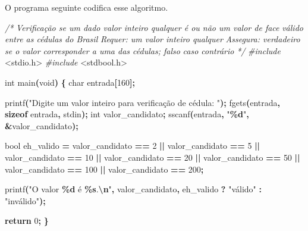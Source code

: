 \documentclass[
  11pt,
  a4paper,
]{scrbook}
\newenvironment{Shaded}{\begin{snugshade}}{\end{snugshade}}
\newcommand{\CommentTok}[1]{\textcolor[rgb]{0.56,0.35,0.01}{\textit{#1}}}
\newcommand{\ControlFlowTok}[1]{\textcolor[rgb]{0.13,0.29,0.53}{\textbf{#1}}}
\newcommand{\DataTypeTok}[1]{\textcolor[rgb]{0.13,0.29,0.53}{#1}}
\newcommand{\DecValTok}[1]{\textcolor[rgb]{0.00,0.00,0.81}{#1}}
\newcommand{\ImportTok}[1]{#1}
\newcommand{\KeywordTok}[1]{\textcolor[rgb]{0.13,0.29,0.53}{\textbf{#1}}}
\newcommand{\NormalTok}[1]{#1}
\newcommand{\OperatorTok}[1]{\textcolor[rgb]{0.81,0.36,0.00}{\textbf{#1}}}
\newcommand{\PreprocessorTok}[1]{\textcolor[rgb]{0.56,0.35,0.01}{\textit{#1}}}
\newcommand{\SpecialCharTok}[1]{\textcolor[rgb]{0.81,0.36,0.00}{\textbf{#1}}}
\newcommand{\StringTok}[1]{\textcolor[rgb]{0.31,0.60,0.02}{#1}}
\begin{document}
O programa seguinte codifica esse algoritmo.

\begin{Shaded}
\begin{Highlighting}[]
\CommentTok{/*}
\CommentTok{Verificação se um dado valor inteiro qualquer é ou não um valor de face}
\CommentTok{    válido entre as cédulas do Brasil}
\CommentTok{Requer: um valor inteiro qualquer}
\CommentTok{Assegura: verdadeiro se o valor corresponder a uma das cédulas; falso}
\CommentTok{    caso contrário}
\CommentTok{*/}
\PreprocessorTok{\#include }\ImportTok{\textless{}stdio.h\textgreater{}}
\PreprocessorTok{\#include }\ImportTok{\textless{}stdbool.h\textgreater{}}

\DataTypeTok{int}\NormalTok{ main}\OperatorTok{(}\DataTypeTok{void}\OperatorTok{)} \OperatorTok{\{}
    \DataTypeTok{char}\NormalTok{ entrada}\OperatorTok{[}\DecValTok{160}\OperatorTok{];}

\NormalTok{    printf}\OperatorTok{(}\StringTok{"Digite um valor inteiro para verificação de cédula: "}\OperatorTok{);}
\NormalTok{    fgets}\OperatorTok{(}\NormalTok{entrada}\OperatorTok{,} \KeywordTok{sizeof}\NormalTok{ entrada}\OperatorTok{,}\NormalTok{ stdin}\OperatorTok{);}
    \DataTypeTok{int}\NormalTok{ valor\_candidato}\OperatorTok{;}
\NormalTok{    sscanf}\OperatorTok{(}\NormalTok{entrada}\OperatorTok{,} \StringTok{"}\SpecialCharTok{\%d}\StringTok{"}\OperatorTok{,} \OperatorTok{\&}\NormalTok{valor\_candidato}\OperatorTok{);}

    \DataTypeTok{bool}\NormalTok{ eh\_valido }\OperatorTok{=}\NormalTok{ valor\_candidato }\OperatorTok{==} \DecValTok{2} \OperatorTok{||}\NormalTok{ valor\_candidato }\OperatorTok{==} \DecValTok{5} \OperatorTok{||}
\NormalTok{                        valor\_candidato }\OperatorTok{==} \DecValTok{10} \OperatorTok{||}\NormalTok{ valor\_candidato }\OperatorTok{==} \DecValTok{20} \OperatorTok{||}
\NormalTok{                        valor\_candidato }\OperatorTok{==} \DecValTok{50} \OperatorTok{||}\NormalTok{ valor\_candidato }\OperatorTok{==} \DecValTok{100} \OperatorTok{||}
\NormalTok{                        valor\_candidato }\OperatorTok{==} \DecValTok{200}\OperatorTok{;}

\NormalTok{    printf}\OperatorTok{(}\StringTok{"O valor }\SpecialCharTok{\%d}\StringTok{ é }\SpecialCharTok{\%s}\StringTok{.}\SpecialCharTok{\textbackslash{}n}\StringTok{"}\OperatorTok{,}\NormalTok{ valor\_candidato}\OperatorTok{,}
\NormalTok{        eh\_valido }\OperatorTok{?} \StringTok{"válido"} \OperatorTok{:} \StringTok{"inválido"}\OperatorTok{);}

    \ControlFlowTok{return} \DecValTok{0}\OperatorTok{;}
\OperatorTok{\}}
\end{Highlighting}
\end{Shaded}
\end{document}
